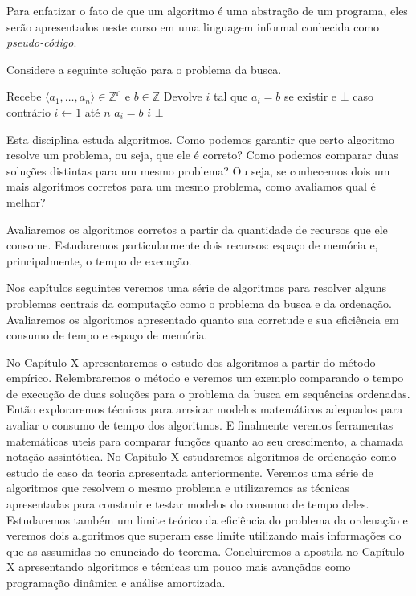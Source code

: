 Para enfatizar o fato de que um algoritmo é uma abstração de um programa, eles serão apresentados neste curso em uma linguagem informal conhecida como {\em pseudo-código}.

\begin{example}
  Considere a seguinte solução para o problema da busca.

\begin{codebox}
\li \Comment Recebe $\langle a_1, \dots, a_n \rangle \in \mathbb{Z^n}$ e $b \in \mathbb{Z}$
\li \Comment Devolve $i$ tal que $a_i = b$ se existir e $\bot$ caso contrário
\li \For $i \gets 1$ até $n$
\li \Do \If $a_i = b$
\li     \Then \Return $i$
        \End
    \End
\li \Return $\bot$
\End
\end{codebox}
  
\end{example}

Esta disciplina estuda algoritmos.
Como podemos garantir que certo algoritmo resolve um problema, ou seja, que ele é correto?
Como podemos comparar duas soluções distintas para um mesmo problema?
Ou seja, se conhecemos dois um mais algoritmos corretos para um mesmo problema, como avaliamos qual é melhor?

Avaliaremos os algoritmos corretos a partir da quantidade de recursos que ele consome.
Estudaremos particularmente dois recursos: espaço de memória e, principalmente, o tempo de execução.

Nos capítulos seguintes veremos uma série de algoritmos para resolver alguns problemas centrais da computação como o problema da busca e da ordenação.
Avaliaremos os algoritmos apresentado quanto sua corretude e sua eficiência em consumo de tempo e espaço de memória.

No Capítulo X apresentaremos o estudo dos algoritmos a partir do método empírico.
Relembraremos o método e veremos um exemplo comparando o tempo de execução de duas soluções para o problema da busca em sequências ordenadas.
Então exploraremos técnicas para arrsicar modelos matemáticos adequados para avaliar o consumo de tempo dos algoritmos.
E finalmente veremos ferramentas matemáticas uteis para comparar funções quanto ao seu crescimento, a chamada notação assintótica.
No Capitulo X estudaremos algoritmos de ordenação como estudo de caso da teoria apresentada anteriormente.
Veremos uma série de algoritmos que resolvem o mesmo problema e utilizaremos as técnicas apresentadas para construir e testar modelos do consumo de tempo deles.
Estudaremos também um limite teórico da eficiência do problema da ordenação e veremos dois algoritmos que superam esse limite utilizando mais informações do que as assumidas no enunciado do teorema.
Concluiremos a apostila no Capítulo X apresentando algoritmos e técnicas um pouco mais avançãdos como programação dinâmica e análise amortizada.

